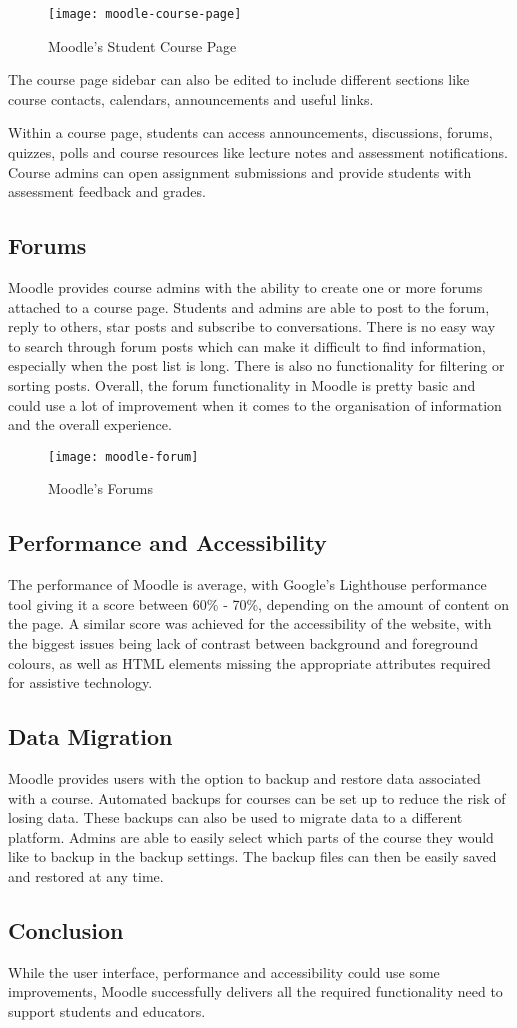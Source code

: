 \begin{figure}[h!]
    \centering
    \texttt{[image: moodle-course-page]}
    \caption{Moodle's Student Course Page}
\end{figure}

The course page sidebar can also be edited to include different sections like course contacts, calendars, announcements and useful links.

Within a course page, students can access announcements, discussions, forums, quizzes, polls and course resources like lecture notes and assessment notifications.
Course admins can open assignment submissions and provide students with assessment feedback and grades.

\subsection{Forums}
Moodle provides course admins with the ability to create one or more forums attached to a course page.
Students and admins are able to post to the forum, reply to others, star posts and subscribe to conversations.
There is no easy way to search through forum posts which can make it difficult to find information, especially when the post list is long.
There is also no functionality for filtering or sorting posts.
Overall, the forum functionality in Moodle is pretty basic and could use a lot of improvement when it comes to the organisation of information and the overall experience.

\begin{figure}[h!]
    \centering
    \texttt{[image: moodle-forum]}
    \caption{Moodle's Forums}
\end{figure}

\subsection{Performance and Accessibility}
The performance of Moodle is average, with Google's Lighthouse performance tool giving it a score between 60\% - 70\%, depending on the amount of content on the page.
A similar score was achieved for the accessibility of the website, with the biggest issues being lack of contrast between background and foreground colours, as well as HTML elements missing the appropriate attributes required for assistive technology.

\subsection{Data Migration}
Moodle provides users with the option to backup and restore data associated with a course.
Automated backups for courses can be set up to reduce the risk of losing data.
These backups can also be used to migrate data to a different platform.
Admins are able to easily select which parts of the course they would like to backup in the backup settings.
The backup files can then be easily saved and restored at any time.

\subsection{Conclusion}
While the user interface, performance and accessibility could use some improvements, Moodle successfully delivers all the required functionality need to support students and educators.